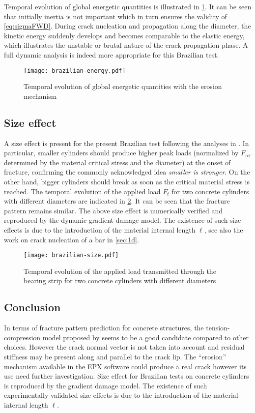 Temporal evolution of global energetic quantities is illustrated in \cref{fig:brazilian_e}. It can be seen that initially inertia is not important which in turn ensures the validity of \eqref{eq:sigmaFWD}. During crack nucleation and propagation along the diameter, the kinetic energy suddenly develops and becomes comparable to the elastic energy, which illustrates the unstable or brutal nature of the crack propagation phase. A full dynamic analysis is indeed more appropriate for this Brazilian test.
\begin{figure}[htbp]
\centering
\texttt{[image: brazilian-energy.pdf]}
\caption{Temporal evolution of global energetic quantities with the erosion mechanism} \label{fig:brazilian_e}
\end{figure}

\subsection{Size effect}
A size effect is present for the present Brazilian test following the analyses in \cite{RoccoGuineaPlanasElices:1999,RuizOrtizPandolfi:2000}. In particular, smaller cylinders should produce higher peak loads (normalized by $F_\mathrm{ref}$ determined by the material critical stress and the diameter) at the onset of fracture, confirming the commonly acknowledged idea \emph{smaller is stronger}. On the other hand, bigger cylinders should break as soon as the critical material stress is reached. The temporal evolution of the applied load $F_t$ for two concrete cylinders with different diameters are indicated in \cref{fig:brazilian_size}. It can be seen that the fracture pattern remains similar. The above size effect is numerically verified and reproduced by the dynamic gradient damage model. The existence of such size effects is due to the introduction of the material internal length $\ell$, see also the work on crack nucleation of a bar in \cref{sec:1d}.
\begin{figure}[htbp]
\centering
\texttt{[image: brazilian-size.pdf]}
\caption{Temporal evolution of the applied load transmitted through the bearing strip for two concrete cylinders with different diameters} \label{fig:brazilian_size}
\end{figure}

\subsection*{Conclusion}
In terms of fracture pattern prediction for concrete structures, the tension-compression model proposed by \cite{FreddiRoyer-Carfagni:2010} seems to be a good candidate compared to other choices. However the crack normal vector is not taken into account and residual stiffness may be present along and parallel to the crack lip. The ``erosion'' mechanism available in the EPX software could produce a real crack however its use need further investigation. Size effect for Brazilian tests on concrete cylinders is reproduced by the gradient damage model. The existence of such experimentally validated size effects is due to the introduction of the material internal length $\ell$.

